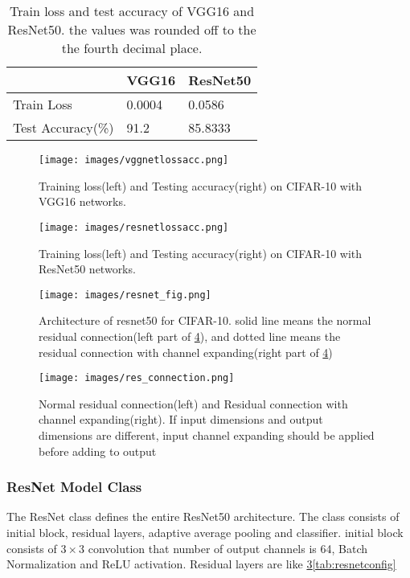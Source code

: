 \documentclass[extendedabs]{bmvc2k}
\begin{document}
\begin{table}[]
\centering
\begin{tabular}{|l|l|l|}
\hline
                  & VGG16  & ResNet50 \\ \hline
Train Loss         & 0.0004  & 0.0586    \\ \hline
Test Accuracy(\%) & 91.2 & 85.8333   \\ \hline
\end{tabular}
\caption{Train loss and test accuracy of VGG16 and ResNet50. the values was rounded off to the the fourth decimal place.}
\label{tab:testresults}
\end{table}

\begin{figure}[t]
	\texttt{[image: images/vggnetlossacc.png]}
	\caption{Training loss(left) and Testing accuracy(right) on CIFAR-10\cite{cifar10} with VGG16 networks.}
 \label{fig:VGGNet16lossacc}
	\vspace{-2mm}
\end{figure}

\begin{figure}[t]
	\texttt{[image: images/resnetlossacc.png]}
	\caption{Training loss(left) and Testing accuracy(right) on CIFAR-10 with ResNet50 networks.}
 \label{fig:ResNetlossacc}
	\vspace{-2mm}
\end{figure}

\begin{figure}[htb!]
	\texttt{[image: images/resnet\_fig.png]}
	\caption{Architecture of resnet50 for CIFAR-10\cite{cifar10}. solid line means the normal residual connection(left part of \ref{fig:resconnection}), and dotted line means the residual connection with channel expanding(right part of \ref{fig:resconnection})}
 \label{fig:resnetfig}
	\vspace{-2mm}
\end{figure}

\begin{figure}[htb!]
	\texttt{[image: images/res\_connection.png]}
	\caption{Normal residual connection(left) and Residual connection with channel expanding(right). If input dimensions and output dimensions are different, input channel expanding should be applied before adding to output}
 \label{fig:resconnection}
	\vspace{-2mm}
\end{figure}

\subsubsection{ResNet Model Class}
The ResNet class defines the entire ResNet50 architecture. The class consists of initial block, residual layers, adaptive average pooling and classifier. initial block consists of $3\times3$ convolution that number of output channels is 64, Batch Normalization and ReLU activation. Residual layers are like \ref{fig:resnetfig}\ref{tab:resnetconfig}
\end{document}
